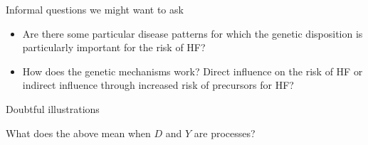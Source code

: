 \documentclass{beamer}\usepackage{listings}
\begin{document}
\begin{frame}[label={sec:org07792b3}]{Informal questions we might want to ask}
\pause
\begin{itemize}
\item Are there some particular disease patterns for which the genetic disposition is particularly
important for the risk of HF?
\end{itemize}
\pause
\begin{itemize}
\item How does the genetic mechanisms work? Direct influence on the risk of HF or indirect influence
through increased risk of precursors for HF?
\end{itemize}

\pause
\begin{block}{Doubtful illustrations}
\def\shift{3}
\begin{center}
\end{center}

What does the above mean when \(D\) and \(Y\) are processes?
\end{block}
\end{frame}
\end{document}
